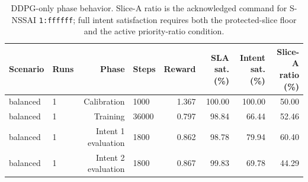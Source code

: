 \begin{table}[t]
\centering
\caption{DDPG-only phase behavior. Slice-A ratio is the acknowledged command for S-NSSAI \texttt{1:ffffff}; full intent satisfaction requires both the protected-slice floor and the active priority-ratio condition.}
\label{tab:ddpg-only-phases}
\begin{tabular}{llrlrrrr}
\toprule
Scenario & Runs & Phase & Steps & Reward & SLA sat. (\%) & Intent sat. (\%) & Slice-A ratio (\%)\\
\midrule
balanced & 1 & Calibration & 1000 & 1.367 & 100.00 & 100.00 & 50.00 \\
balanced & 1 & Training & 36000 & 0.797 & 98.84 & 66.44 & 52.46 \\
balanced & 1 & Intent 1 evaluation & 1800 & 0.862 & 98.78 & 79.94 & 60.40 \\
balanced & 1 & Intent 2 evaluation & 1800 & 0.867 & 99.83 & 69.78 & 44.29 \\
\bottomrule
\end{tabular}
\end{table}
